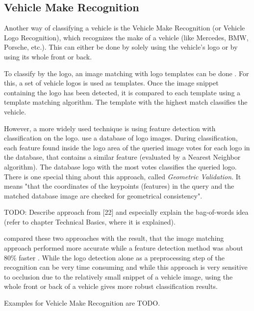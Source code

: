 \subsection{Vehicle Make Recognition}
Another way of classifying a vehicle is the Vehicle Make Recognition (or Vehicle Logo Recognition), which recognizes the make of a vehicle (like Mercedes, BMW, Porsche, etc.). This can either be done by solely using the vehicle's logo or by using its whole front or back.

To classify by the logo, an image matching with logo templates can be done \citep{jain2015car} \citep{wang2007fast}. For this, a set of vehicle logos is used as templates. Once the image snippet containing the logo has been detected, it is compared to each template using a template matching algorithm. The template with the highest match classifies the vehicle.

However, a more widely used technique is using feature detection with classification on the logo. \citeauthor{psyllos2010vehicle} use a database of logo images. During classification, each feature found inside the logo area of the queried image votes for each logo in the database, that contains a similar feature (evaluated by a Nearest Neighbor algorithm). The database logo with the most votes classifies the queried logo. There is one special thing about this approach, called \emph{Geometric Validation}. It means "that the coordinates of the keypoints (features) in the query and the matched database image are checked for geometrical consistency".

TODO: Describe approach from [22] and especially explain the bag-of-words idea (refer to chapter Technical Basics, where it is explained).

\citeauthor{rezaeivehicle} compared these two approaches with the result, that the image matching approach performed more accurate while a feature detection method was about 80\% faster \citep{rezaeivehicle}. While the logo detection alone as a preprocessing step of the recognition can be very time consuming \citep{siddiqui2015robust} and while this approach is very sensitive to occlusion due to the relatively small snippet of a vehicle image, using the whole front or back of a vehicle gives more robust classification results.

Examples for Vehicle Make Recognition are TODO.

